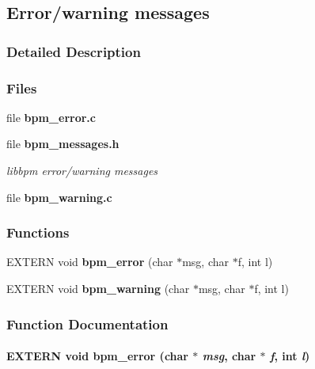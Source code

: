 \subsection{Error/warning messages}
\label{group__message}


\subsubsection{Detailed Description}


\subsubsection*{Files}
\begin{CompactItemize}
\item 
file {\bf bpm\_\-error.c}
\item 
file {\bf bpm\_\-messages.h}
\begin{CompactList}\small\item\em libbpm error/warning messages \item\end{CompactList}

\item 
file {\bf bpm\_\-warning.c}
\end{CompactItemize}
\subsubsection*{Functions}
\begin{CompactItemize}
\item 
EXTERN void {\bf bpm\_\-error} (char $\ast$msg, char $\ast$f, int l)
\item 
EXTERN void {\bf bpm\_\-warning} (char $\ast$msg, char $\ast$f, int l)
\end{CompactItemize}


\subsubsection{Function Documentation}
\paragraph[bpm\_\-error]{\setlength{\rightskip}{0pt plus 5cm}EXTERN void bpm\_\-error (char $\ast$ {\em msg}, \/  char $\ast$ {\em f}, \/  int {\em l})}\hfill\label{group__message_gea352d3bf7620cfbf768f6f90efe5943}


